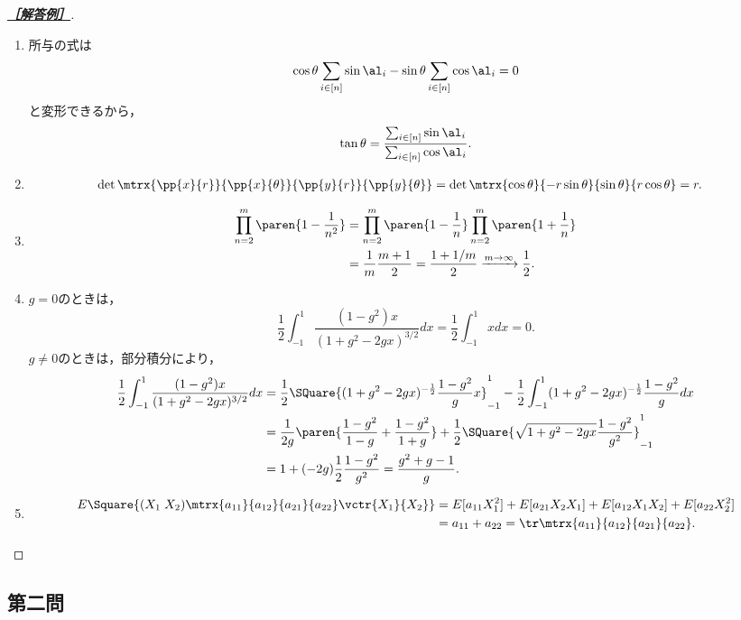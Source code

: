 \documentclass[uplatex,dvipdfmx]{jsarticle}
\begin{document}
\begin{proof}[\textbf{\underline{［解答例］}}]\mbox{}
    \begin{enumerate}
        \item 所与の式は
        \[\cos\theta\sum_{i\in[n]}\sin\al_i-\sin\theta\sum_{i\in[n]}\cos\al_i=0\]
        と変形できるから，
        \[\tan\theta=\frac{\sum_{i\in[n]}\sin\al_i}{\sum_{i\in[n]}\cos\al_i}.\]
        \item \begin{align*}
            \det\mtrx{\pp{x}{r}}{\pp{x}{\theta}}{\pp{y}{r}}{\pp{y}{\theta}}
            &=\det\mtrx{\cos\theta}{-r\sin\theta}{\sin\theta}{r\cos\theta}=r.
        \end{align*}
        \item \begin{align*}
            \prod_{n=2}^m\paren{1-\frac{1}{n^2}}&=\prod_{n=2}^m\paren{1-\frac{1}{n}}\prod_{n=2}^m\paren{1+\frac{1}{n}}\\
            &=\frac{1}{m}\frac{m+1}{2}=\frac{1+1/m}{2}\xrightarrow{m\to\infty}\frac{1}{2}.
        \end{align*}
        \item $g=0$のときは，
        \[\frac{1}{2}\int^1_{-1}\frac{(1-g^2)x}{(1+g^2-2gx)^{3/2}}dx=\frac{1}{2}\int^1_{-1}xdx=0.\]
        $g\ne0$のときは，部分積分により，
        \begin{align*}
            \frac{1}{2}\int^1_{-1}\frac{(1-g^2)x}{(1+g^2-2gx)^{3/2}}dx&=
            \frac{1}{2}\SQuare{(1+g^2-2gx)^{-\frac{1}{2}}\frac{1-g^2}{g}x}^1_{-1}-\frac{1}{2}\int^1_{-1}(1+g^2-2gx)^{-\frac{1}{2}}\frac{1-g^2}{g}dx\\
            &=\frac{1}{2g}\paren{\frac{1-g^2}{1-g}+\frac{1-g^2}{1+g}}+\frac{1}{2}\SQuare{\sqrt{1+g^2-2gx}\frac{1-g^2}{g^2}}^1_{-1}\\
            &=1+(-2g)\frac{1}{2}\frac{1-g^2}{g^2}=\frac{g^2+g-1}{g}.
        \end{align*}
        \item \begin{align*}
            E\Square{(X_1\;X_2)\mtrx{a_{11}}{a_{12}}{a_{21}}{a_{22}}\vctr{X_1}{X_2}}&=E[a_{11}X_1^2]+E[a_{21}X_2X_1]+E[a_{12}X_1X_2]+E[a_{22}X_2^2]\\
            &=a_{11}+a_{22}=\tr\mtrx{a_{11}}{a_{12}}{a_{21}}{a_{22}}.
        \end{align*}
    \end{enumerate}
\end{proof}

\subsection{第二問}
\end{document}
